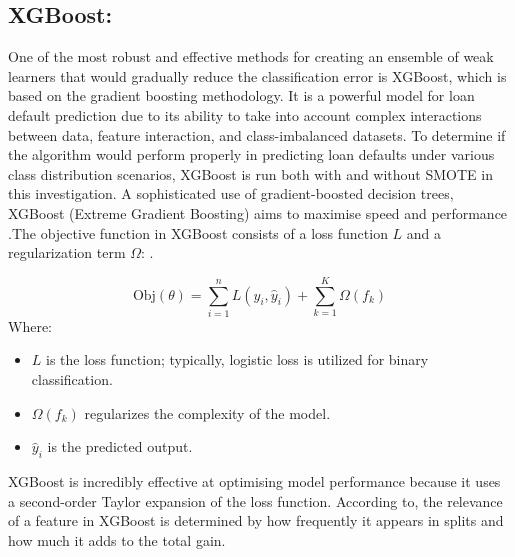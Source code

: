 \documentclass[12pt, a4paper,oneside]{book}
\numberwithin{equation}{section}
\begin{document}
\subsection{ XGBoost:}
One of the most robust and effective methods for creating an ensemble of weak learners that would gradually reduce the classification error is XGBoost, which is based on the gradient boosting methodology. It is a powerful model for loan default prediction due to its ability to take into account complex interactions between data, feature interaction, and class-imbalanced datasets. To determine if the algorithm would perform properly in predicting loan defaults under various class distribution scenarios, XGBoost is run both with and without SMOTE in this investigation.
A sophisticated use of gradient-boosted decision trees, XGBoost (Extreme Gradient Boosting) aims to maximise speed and performance \cite{chen}.The objective function in XGBoost consists of a loss function $L$ and a regularization term $\Omega$:
.

\[\text{Obj}(\theta) = \sum_{i=1}^{n} L(y_i, \hat{y}_i) + \sum_{k=1}^{K} \Omega(f_k)\]
Where:
\begin{itemize}
    \item $L$ is the loss function; typically, logistic loss is utilized for binary classification.
    \item $\Omega(f_k)$ regularizes the complexity of the model.
    \item $\hat{y}_i$ is the predicted output.
\end{itemize}


XGBoost is incredibly effective at optimising model performance because it uses a second-order Taylor expansion of the loss function. According to\cite{lundberg2018consistent}, the relevance of a feature in XGBoost is determined by how frequently it appears in splits and how much it adds to the total gain.
\end{document}
